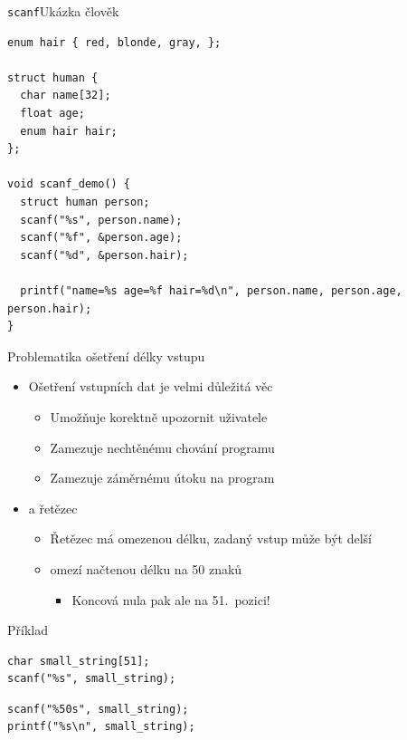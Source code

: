 \begin{frame}[fragile]{\texttt{scanf}}{Ukázka člověk}

\begin{lstlisting}
enum hair { red, blonde, gray, };

struct human {
  char name[32];
  float age;
  enum hair hair;
};

void scanf_demo() {
  struct human person;
  scanf("%s", person.name);
  scanf("%f", &person.age);
  scanf("%d", &person.hair);

  printf("name=%s age=%f hair=%d\n", person.name, person.age, person.hair);
}
\end{lstlisting}

\end{frame}

\begin{frame}[fragile]{Problematika ošetření délky vstupu}

  \begin{itemize}
    \item Ošetření vstupních dat je velmi důležitá věc
    \begin{itemize}
      \item Umožňuje korektně upozornit uživatele
      \item Zamezuje nechtěnému chování programu
      \item Zamezuje záměrnému útoku na program
    \end{itemize}

    \pause

    \item {} a řetězec
    \begin{itemize}
      \item Řetězec má omezenou délku, zadaný vstup může být delší

      \pause

      \item {} omezí načtenou délku na 50 znaků
      \begin{itemize}
	\item Koncová nula pak ale na 51.\ pozici!
      \end{itemize}
    \end{itemize}

  \end{itemize}


\begin{block}{Příklad}
\begin{lstlisting}
char small_string[51];
scanf("%s", small_string);
\end{lstlisting}
\begin{lstlisting}
scanf("%50s", small_string);
printf("%s\n", small_string);
\end{lstlisting}
\end{block}

\end{frame}

